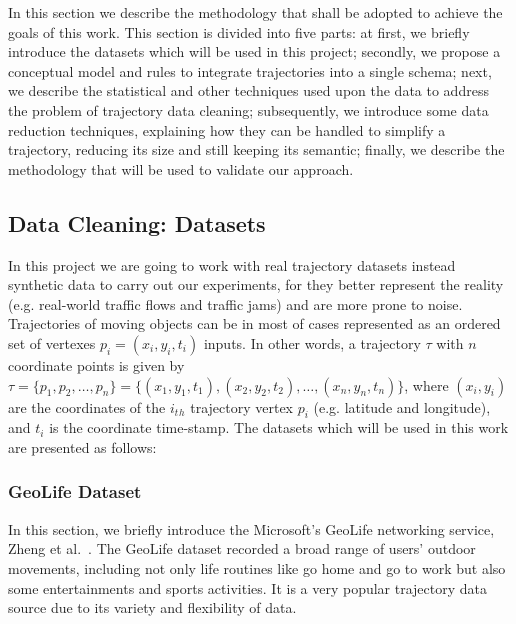 \documentclass[a4paper,12pt]{article}
\begin{document}
In this section we describe the methodology that shall be adopted to achieve the goals of this work. This section is divided into five parts: at first, we briefly introduce the datasets which will be used in this project; secondly, we propose a conceptual model and rules to integrate trajectories into a single schema; next, we describe the statistical and other techniques used upon the data to address the problem of trajectory data cleaning; subsequently, we introduce some data reduction techniques, explaining how they can be handled to simplify a trajectory, reducing its size and still keeping its semantic; finally, we describe the methodology that will be used to validate our approach.


\subsection{Data Cleaning: Datasets}\label{sec:datasets}
In this project we are going to work with real trajectory datasets instead synthetic data to carry out our experiments, for they better represent the reality (e.g. real-world traffic flows and traffic jams) and are more prone to noise. Trajectories of moving objects can be in most of cases represented as an ordered set of vertexes $p_i = (x_i, y_i, t_i)$ inputs. In other words, a trajectory $\tau$ with $n$ coordinate points is given by $\tau = \{p_1, p_2, \dots, p_n\} = \{(x_1, y_1, t_1), (x_2, y_2, t_2), \dots,(x_n, y_n, t_n)\}$, where $(x_i, y_i)$ are the coordinates of the $i_t$$_h$ trajectory vertex $p_i$ (e.g. latitude and longitude), and $t_i$ is the coordinate time-stamp. The datasets which will be used in this work are presented as follows:
 
\subsubsection{GeoLife Dataset}\label{sec:geolife} 
In this section, we briefly introduce the Microsoft's GeoLife networking service, Zheng et al.~\cite{zheng2010}. The GeoLife dataset recorded a broad range of users' outdoor movements, including not only life routines like go home and go to work but also some entertainments and sports activities. It is a very popular trajectory data source due to its variety and flexibility of data.
\end{document}
